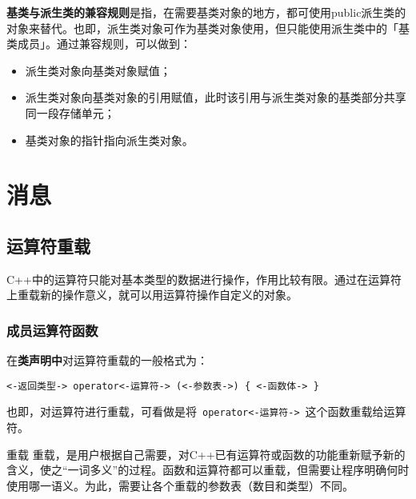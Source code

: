 \documentclass[10pt, a4paper, oneside, fontset=none]{ctexart}
\theoremstyle{plain}
\theoremstyle{definition}
\newcommand{\zhu}[2][]{\begin{note}{#1}\xiu #2\end{note}}
\newcommand{\tboba}[1]{\textbf{\kai\color{bali!75!black}#1}}
\begin{document}
\tboba{基类与派生类的兼容规则}是指，在需要基类对象的地方，都可使用public派生类的对象来替代。也即，派生类对象可作为基类对象使用，但只能使用派生类中的「基类成员」。通过兼容规则，可以做到：\label{兼容规则}
\begin{itemize}
	\item 派生类对象向基类对象赋值；
	\item 派生类对象向基类对象的引用赋值，此时该引用与派生类对象的基类部分共享同一段存储单元；
	\item 基类对象的指针指向派生类对象。
\end{itemize}

\newpage
\section{消息}

\subsection{运算符重载}
C++中的运算符只能对基本类型的数据进行操作，作用比较有限。通过在运算符上重载新的操作意义，就可以用运算符操作自定义的对象。

\subsubsection{成员运算符函数}

在\textbf{类声明中}对运算符重载的一般格式为：
\begin{lstlisting}[style=intro]
	<-返回类型-> operator<-运算符-> (<-参数表->) { <-函数体-> }
\end{lstlisting}
也即，对运算符进行重载，可看做是将~\lstinline[style=intro]|operator<-运算符->|~这个函数重载给运算符。

\zhu[重载]{
	重载，是用户根据自己需要，对C++已有运算符或函数的功能重新赋予新的含义，使之“一词多义”的过程。函数和运算符都可以重载，但需要让程序明确何时使用哪一语义。为此，需要让各个重载的参数表（数目和类型）不同。
}
\end{document}
